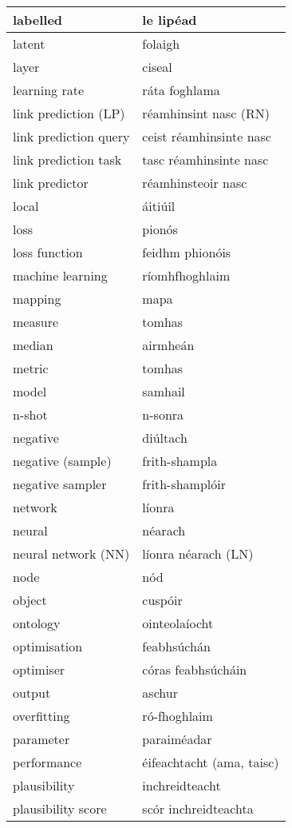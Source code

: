 \documentclass{article}
\begin{document}
\begin{longtable}{|l|l|}
		labelled&le lipéad\\ \hline 
		latent&folaigh\\ \hline 
		layer&ciseal\\ \hline 
		learning rate&ráta foghlama\\ \hline 
		link prediction (LP)&réamhinsint nasc (RN)\\ \hline 
		link prediction query&ceist réamhinsinte nasc\\ \hline 
		link prediction task&tasc réamhinsinte nasc\\ \hline 
		link predictor&réamhinsteoir nasc\\ \hline 
		local&áitiúil\\ \hline 
		loss&pionós\\ \hline 
		loss function&feidhm phionóis\\ \hline 
		machine learning&ríomhfhoghlaim\\ \hline 
		mapping&mapa\\ \hline 
		measure&tomhas\\ \hline 
		median&airmheán\\ \hline 
		metric&tomhas\\ \hline 
		model&samhail\\ \hline 
		n-shot&n-sonra\\ \hline 
		negative&diúltach\\ \hline 
		negative (sample)&frith-shampla\\ \hline 
		negative sampler&frith-shamplóir\\ \hline 
		network&líonra\\ \hline 
		neural&néarach\\ \hline 
		neural network (NN)&líonra néarach (LN)\\ \hline 
		node&nód\\ \hline 
		object&cuspóir\\ \hline 
		ontology&ointeolaíocht\\ \hline 
		optimisation&feabhsúchán\\ \hline 
		optimiser&córas feabhsúcháin\\ \hline 
		output&aschur\\ \hline 
		overfitting&ró-fhoghlaim\\ \hline 
		parameter&paraiméadar\\ \hline 
		performance&éifeachtacht (ama, taisc)\\ \hline 
		plausibility&inchreidteacht\\ \hline 
		plausibility score&scór inchreidteachta\\ \hline 

\end{longtable}
\end{document}

